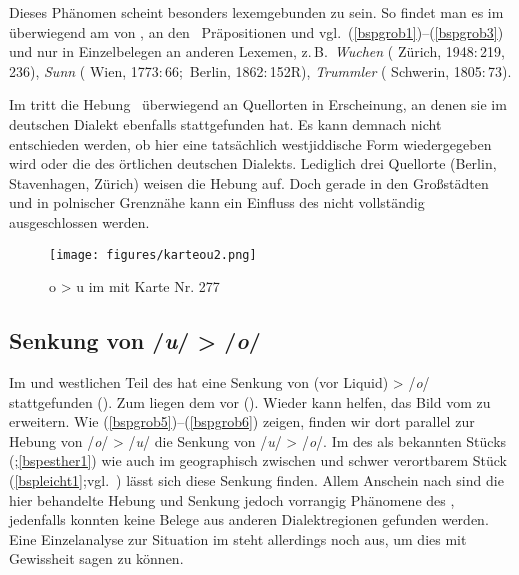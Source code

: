 Dieses Phänomen scheint besonders lexemgebunden zu sein. So findet man es im  überwiegend am  von , an den \,%
Präpositionen  und  vgl.\, (\ref{bspgrob1})--(\ref{bspgrob3}) und nur in Einzelbelegen an anderen Lexemen, z.\,B.\, \textit{Wuchen}  ( Zürich, 1948:\,219, 236), \textit{Sunn}  ( Wien, 1773:\,66;\,  Berlin, 1862:\,152R), \textit{Trummler}  ( Schwerin, 1805:\,73). 

Im  tritt die Hebung \,%
überwiegend an Quellorten in Erscheinung, an denen sie im deutschen Dialekt ebenfalls stattgefunden hat. Es kann demnach nicht entschieden werden, ob hier eine tatsächlich westjiddische Form wiedergegeben wird oder die des örtlichen deutschen Dialekts. Lediglich drei Quellorte (Berlin, Stavenhagen, Zürich) weisen die Hebung auf. Doch gerade in den Großstädten und in polnischer Grenznähe kann ein Einfluss des \hai{{\OJ}} nicht vollständig ausgeschlossen werden.

 \begin{figure}
		\centering
\texttt{[image: figures/karteou2.png]}
		\caption{\label{karteou} o > u im  mit  Karte Nr. 277}
		\end{figure}

		
		

 \subsection{Senkung von /\textit{u}/ > /\textit{o}/} \label{u_o} 
Im \hai{{\ZOJ}} und westlichen Teil des \hai{{\SOJ}} hat eine Senkung von  (vor Liquid)  > /\textit{o}/ stattgefunden (\citealt[84]{Herzog1992}). 
Zum \hai{{\WJ}} liegen dem   vor (\citealt[84]{Herzog1992}). Wieder kann  helfen, das Bild vom \hai{{\WJ}} zu erweitern. Wie (\ref{bspgrob5})–(\ref{bspgrob6}) zeigen, finden wir dort parallel zur Hebung von /\textit{o}/ > /\textit{u}/ die Senkung von /\textit{u}/ > /\textit{o}/. Im  des als  bekannten Stücks  %
(;\ref{bspesther1}) wie auch im geographisch zwischen  und  schwer verortbarem 
Stück   (\ref{bspleicht1};vgl.\, \citealt[421]{FleischerSchaefer2012}) lässt sich diese Senkung finden. Allem Anschein nach sind die hier behandelte Hebung und Senkung jedoch vorrangig  Phänomene des , jedenfalls konnten keine Belege aus anderen Dialektregionen gefunden werden. Eine Einzelanalyse zur Situation im \hai{{\WJ}} steht allerdings noch aus, um dies mit Gewissheit sagen zu können.



